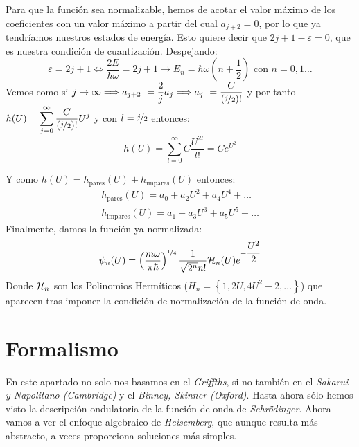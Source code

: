 \documentclass{report}
\begin{document}
    \noindent Para que la función sea normalizable, hemos de acotar el valor máximo de los coeficientes
    con un valor máximo a partir del cual $a_{j+2}=0$,
    por lo que ya tendríamos nuestros estados de energía. Esto quiere decir
    que $2j+1-\varepsilon=0$, que es nuestra condición de cuantización. Despejando:
    \[\varepsilon=2j+1\Longleftrightarrow \dfrac{2E}{\hbar\omega}=2j+1
    \longrightarrow\boxed{E_n=\hbar\omega\left(n+\dfrac12\right)}\text{ con }n=0,1\dots\]
    Vemos como si $j\rightarrow\infty\Longrightarrow a_{j+2}~=\dfrac{2}{j}a_j\Longrightarrow
    a_j~=\dfrac{C}{\left(\nicefrac{j}{2}\right)!}$ y por tanto $h(U)=\displaystyle\sum_{j=0}^\infty
    \dfrac{C}{\left(\nicefrac{j}{2}\right)!}U^j$ y con $l=\nicefrac{j}{2}$ entonces:\\

    \[h(U)=\displaystyle\sum_{l=0}^\infty C\dfrac{U^{2l}}{l!}=Ce^{U^2}\]

    \noindent Y como $h(U)=h_{\text{pares}}(U)+h_{\text{impares}}(U)$ entonces:
    \[\begin{aligned}
      h_{\text{pares}}(U)=a_0+a_2U^2+a_4U^4+\dots\\
      h_{\text{impares}}(U)=a_1+a_3U^3+a_5U^5+\dots
    \end{aligned}\]
    \noindent Finalmente, damos la función ya normalizada:
    \[\psi_n(U)=\left(\dfrac{m\omega}{\pi\hbar}\right)^{\nicefrac{1}{4}}
    \dfrac{1}{\sqrt{2^n}n!}\mathcal{H}_n(U)e^{-\dfrac{U^2}{2}}\]
    Donde $\mathcal{H}_n$ son los Polinomios Hermíticos ($H_n=\left\{1,2U,4U^2-2,\dots\right\}$)
    que aparecen tras imponer la condición de normalización de la función
    de onda.
\chapter{Formalismo}
  \vspace{0.3cm}
  \noindent En este apartado no solo nos basamos en el \textit{Griffths}, si no
  también en el \textit{Sakarui y Napolitano (Cambridge)} y el 
  \textit{Binney, Skinner (Oxford)}. 
  \noindent Hasta ahora sólo hemos visto la descripción ondulatoria de 
  la función de onda de \textit{Schrödinger}. Ahora vamos a ver el
  enfoque algebraico de \textit{Heisemberg}, que aunque resulta más abstracto,
  a veces proporciona soluciones más simples.
  \vspace{0.2cm}
\end{document}
